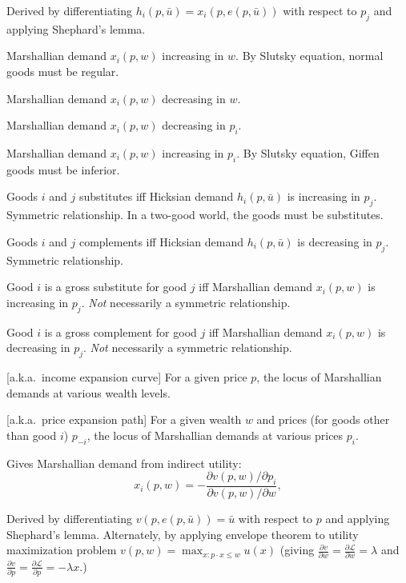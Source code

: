 \documentclass[8pt,letterpaper, landscape]{extarticle} %
\begin{document}
\begin{multicols}{3}
\begin{description}
Derived by differentiating $ h_i (p, \bar{u}) = x_i (p, e(p, \bar{u})) $ with respect to $ p_j $ and applying Shephard's lemma.

 Marshallian demand $ x_i(p, w) $ increasing in $ w $. By Slutsky equation, normal goods must be regular.

 Marshallian demand $ x_i(p, w) $ decreasing in $ w $.

 Marshallian demand $ x_i(p, w) $ decreasing in $ p_i $.

 Marshallian demand $ x_i(p, w) $ increasing in $ p_i $. By Slutsky equation, Giffen goods must be inferior.

 Goods $ i $ and $ j $ substitutes iff Hicksian demand $ h_i(p, \bar{u}) $ is increasing in $ p_j $. Symmetric relationship. In a two-good world, the goods must be substitutes.

 Goods $ i $ and $ j $ complements iff Hicksian demand $ h_i(p, \bar{u}) $ is decreasing in $ p_j $. Symmetric relationship.

 Good $ i $ is a gross substitute for good $ j $ iff Marshallian demand $ x_i(p, w) $ is increasing in $ p_j $. \textit{Not} necessarily a symmetric relationship.

 Good $ i $ is a gross complement for good $ j $ iff Marshallian demand $ x_i(p, w) $ is decreasing in $ p_j $. \textit{Not} necessarily a symmetric relationship.

 [a.k.a.\ income expansion curve] For a given price $ p $, the locus of Marshallian demands at various wealth levels.

 [a.k.a.\ price expansion path] For a given wealth $ w $ and prices (for goods other than good $ i $) $ p_{-i} $, the locus of Marshallian demands at various prices $ p_i $.

 Gives Marshallian demand from indirect utility:
$$ x_i (p, w) = - \frac{\partial v(p,w) / \partial p_i}{\partial v(p,w) / \partial w}, $$

Derived by differentiating $ v(p, e(p,\bar{u})) = \bar{u} $ with respect to $ p $ and applying Shephard's lemma. Alternately, by applying envelope theorem to utility maximization problem $ v(p,w) = \max_{x \colon p \cdot x \leq w} u(x) $ (giving $ \frac{\partial v}{\partial w} = \frac{\partial \mathcal{L}}{\partial w} = \lambda $ and $ \frac{\partial v}{\partial p} = \frac{\partial \mathcal{L}}{\partial p} = - \lambda x $.)


\end{description}
\end{multicols}
\end{document}
